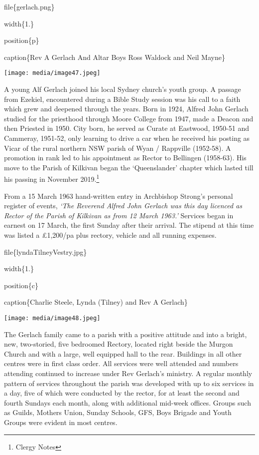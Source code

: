 file\{gerlach.png\}

width\{1.\}

position\{p\}

caption\{Rev A Gerlach And Altar Boys Ross Waldock and Neil Mayne\}

\texttt{[image: media/image47.jpeg]}

A young Alf Gerlach joined his local Sydney church's youth group. A passage from Ezekiel, encountered during a Bible Study session was his call to a faith which grew and deepened through the years. Born in 1924, Alfred John Gerlach studied for the priesthood through Moore College from 1947, made a Deacon and then Priested in 1950. City born, he served as Curate at Eastwood, 1950-51 and Cammeray, 1951-52, only learning to drive a car when he received his posting as Vicar of the rural northern NSW parish of Wyan / Rappville (1952-58). A promotion in rank led to his appointment as Rector to Bellingen (1958-63). His move to the Parish of Kilkivan began the `Queenslander' chapter which lasted till his passing in November 2019.\footnote{Clergy Notes}

From a 15 March 1963 hand-written entry in Archbishop Strong's personal register of events, \emph{`The Reverend Alfred John Gerlach was this day licenced as Rector of the Parish of Kilkivan as from 12 March 1963.'} Services began in earnest on 17 March, the first Sunday after their arrival. The stipend at this time was listed a £1,200/pa plus rectory, vehicle and all running expenses.

file\{lyndaTilneyVestry.jpg\}

width\{1.\}

position\{c\}

caption\{Charlie Steele, Lynda (Tilney) and Rev A Gerlach\}

\texttt{[image: media/image48.jpeg]}

The Gerlach family came to a parish with a positive attitude and into a bright, new, two-storied, five bedroomed Rectory, located right beside the Murgon Church and with a large, well equipped hall to the rear. Buildings in all other centres were in first class order. All services were well attended and numbers attending continued to increase under Rev Gerlach's ministry. A regular monthly pattern of services throughout the parish was developed with up to six services in a day, five of which were conducted by the rector, for at least the second and fourth Sundays each month, along with additional mid-week offices. Groups such as Guilds, Mothers Union, Sunday Schools, GFS, Boys Brigade and Youth Groups were evident in most centres.

